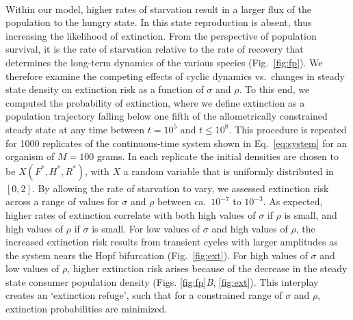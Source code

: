 \documentclass{pnastwo}
\begin{document}
\begin{article}
\\
Within our model, higher rates of starvation result in a larger flux of the population to the hungry state.
In this state reproduction is absent, thus increasing the likelihood of extinction.  From the perspective of population survival, it is the rate of starvation relative to the rate of recovery that determines the long-term dynamics of the various species (Fig.~\ref{fig:fp}).
We therefore examine the competing effects of cyclic dynamics vs.\ changes in steady state density on extinction risk as a function of $\sigma$ and $\rho$.
To this end, we computed the probability of extinction, where we define extinction as a population trajectory falling below one fifth of the allometrically constrained steady state at any time between $t=10^5$ and $t \leq 10^8$.
This procedure is repeated for 1000 replicates of the continuous-time system shown in Eq.~\ref{eq:system} for an organism of $M=100$ grams.
In each replicate the initial densities are chosen to be $X(F^*,H^*,R^*)$, with $X$ a random variable that is uniformly distributed in $[0,2]$.
By allowing the rate of starvation to vary, we assessed extinction risk across a range of values for $\sigma$ and $\rho$ between ca.\ $10^{-7}$ to $10^{-3}$. %
As expected, higher rates of extinction correlate with both high values of $\sigma$ if $\rho$ is small, and high values of $\rho$ if $\sigma$ is small.
For low values of $\sigma$ and high values of $\rho$, the increased extinction risk results from transient cycles with larger amplitudes as the system nears the Hopf bifurcation (Fig.~\ref{fig:ext}).
For high values of $\sigma$ and low values of $\rho$, higher extinction risk arises because of the decrease in the steady state consumer population density (Figs. \ref{fig:fp}\emph{B}, \ref{fig:ext}).
This interplay creates an `extinction refuge', such that for a constrained range of $\sigma$ and $\rho$, extinction probabilities are minimized.


\end{article}
\end{document}
